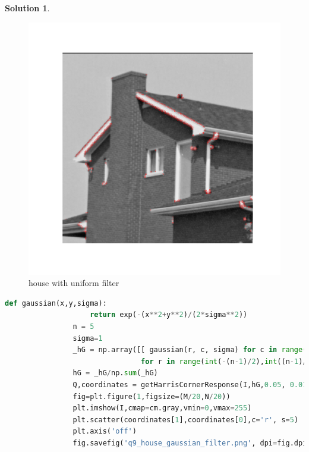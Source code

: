 \documentclass[11pt]{article}
\theoremstyle{plain}
\theoremstyle{definition}
\newtheorem{solution}{Solution}
\theoremstyle{remark}
\begin{document}
\begin{solution}
\begin{enumerate}
			\begin{figure}[h]
				\centering
				\includegraphics[width=\textwidth]{q9_house_uniform_filter.png}
				\caption{house with uniform filter}
			\end{figure}
			
			\begin{lstlisting}[language=Python, caption=house with gaussian filter]
				def gaussian(x,y,sigma):
				    return exp(-(x**2+y**2)/(2*sigma**2))
				n = 5
				sigma=1
				_hG = np.array([[ gaussian(r, c, sigma) for c in range(int(-(n-1)/2),int((n-1)/2 + 1))] 
				                for r in range(int(-(n-1)/2),int((n-1)/2 + 1))])
				hG = _hG/np.sum(_hG)
				Q,coordinates = getHarrisCornerResponse(I,hG,0.05, 0.01)
				fig=plt.figure(1,figsize=(M/20,N/20))
				plt.imshow(I,cmap=cm.gray,vmin=0,vmax=255)
				plt.scatter(coordinates[1],coordinates[0],c='r', s=5)
				plt.axis('off')
				fig.savefig('q9_house_gaussian_filter.png', dpi=fig.dpi)
			\end{lstlisting}
			

\end{enumerate}
\end{solution}
\end{document}
